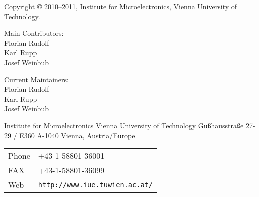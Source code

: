 
\clearpage

Copyright {\copyright} 2010--2011, Institute for Microelectronics, Vienna University of Technology.

\vspace{2.5cm}

Main Contributors:\\ 

Florian Rudolf\\
Karl Rupp\\
Josef Weinbub\\

\vspace{2.5cm}

Current Maintainers: \\

Florian Rudolf\\
Karl Rupp\\
Josef Weinbub\\


\vspace{7.0cm}

Institute for Microelectronics\newline
Vienna University of Technology\newline
Gu\ss hausstra\ss e 27-29 / E360\newline
A-1040 Vienna, Austria/Europe\newline


\begin{tabular}{ll}
Phone  & +43-1-58801-36001\\
FAX    & +43-1-58801-36099\\
Web    & \texttt{http://www.iue.tuwien.ac.at/}
\end{tabular}



